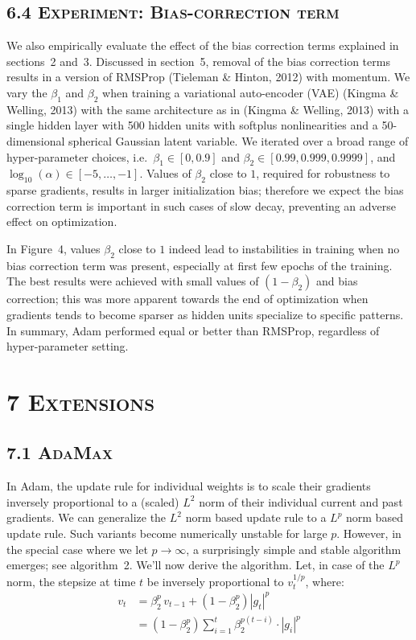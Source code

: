 \documentclass[11pt]{article}
\begin{document}
\vspace{1em}

\subsection*{6.4 \textsc{Experiment: Bias-correction term}}

We also empirically evaluate the effect of the bias correction
terms explained in sections~2 and~3. Discussed in section~5,
removal of the bias correction terms results in a version of
RMSProp (Tieleman \& Hinton, 2012) with momentum. We vary the
$\beta_1$ and $\beta_2$ when training a variational auto-encoder
(VAE) (Kingma \& Welling, 2013) with the same architecture as in
(Kingma \& Welling, 2013) with a single hidden layer with 500
hidden units with softplus nonlinearities and a 50-dimensional
spherical Gaussian latent variable. We iterated over a broad
range of hyper-parameter choices, i.e.\
$\beta_1 \in [0, 0.9]$ and
$\beta_2 \in [0.99, 0.999, 0.9999]$, and
$\log_{10}(\alpha) \in [-5, \ldots, -1]$. Values of $\beta_2$
close to $1$, required for robustness to sparse gradients,
results in larger initialization bias; therefore we expect the
bias correction term is important in such cases of slow decay,
preventing an adverse effect on optimization.

In Figure~4, values $\beta_2$ close to $1$ indeed lead to
instabilities in training when no bias correction term was
present, especially at first few epochs of the training. The
best results were achieved with small values of $(1 - \beta_2)$
and bias correction; this was more apparent towards the end of
optimization when gradients tends to become sparser as hidden
units specialize to specific patterns. In summary, Adam performed
equal or better than RMSProp, regardless of hyper-parameter
setting.

\vspace{0.5em}

\section*{7 \textsc{Extensions}}

\subsection*{7.1 \textsc{AdaMax}}

In Adam, the update rule for individual weights is to scale
their gradients inversely proportional to a (scaled) $L^2$ norm
of their individual current and past gradients. We can
generalize the $L^2$ norm based update rule to a $L^p$ norm
based update rule. Such variants become numerically unstable for
large $p$. However, in the special case where we let
$p \to \infty$, a surprisingly simple and stable algorithm
emerges; see algorithm~2. We'll now derive the algorithm. Let,
in case of the $L^p$ norm, the stepsize at time $t$ be inversely
proportional to $v_t^{1/p}$, where:
%
\begin{align}
v_t &= \beta_2^p \, v_{t-1} + (1 - \beta_2^p) |g_t|^p \\
    &= (1 - \beta_2^p) \sum_{i=1}^{t} \beta_2^{p(t-i)} \cdot |g_i|^p
\end{align}
\end{document}
